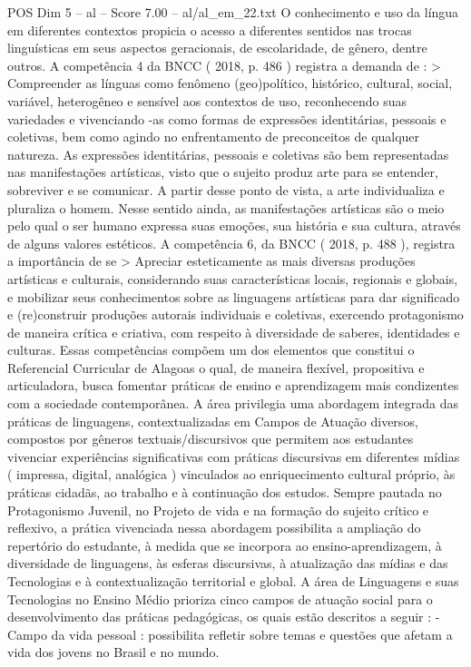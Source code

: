 \begin{textsample}{POS Dim 5 – al – Score 7.00 – al/al\_em\_22.txt}
O conhecimento e uso da língua em diferentes contextos propicia o acesso a diferentes sentidos nas trocas linguísticas em seus aspectos geracionais, de escolaridade, de gênero, dentre outros.
A competência 4 da BNCC ( 2018, p. 486 ) registra a demanda de : > Compreender as línguas como fenômeno (geo)político, histórico, cultural, social, variável, heterogêneo e sensível aos contextos de uso, reconhecendo suas variedades e vivenciando -as como formas de expressões identitárias, pessoais e coletivas, bem como agindo no enfrentamento de preconceitos de qualquer natureza.
As expressões identitárias, pessoais e coletivas são bem representadas nas manifestações artísticas, visto que o sujeito produz arte para se entender, sobreviver e se comunicar.
A partir desse ponto de vista, a arte individualiza e pluraliza o homem.
Nesse sentido ainda, as manifestações artísticas são o meio pelo qual o ser humano expressa suas emoções, sua história e sua cultura, através de alguns valores estéticos.
A competência 6, da BNCC ( 2018, p. 488 ), registra a importância de se > Apreciar esteticamente as mais diversas produções artísticas e culturais, considerando suas características locais, regionais e globais, e mobilizar seus conhecimentos sobre as linguagens artísticas para dar significado e (re)construir produções autorais individuais e coletivas, exercendo protagonismo de maneira crítica e criativa, com respeito à diversidade de saberes, identidades e culturas.
Essas competências compõem um dos elementos que constitui o Referencial Curricular de Alagoas o qual, de maneira flexível, propositiva e articuladora, busca fomentar práticas de ensino e aprendizagem mais condizentes com a sociedade contemporânea.
A área privilegia uma abordagem integrada das práticas de linguagens, contextualizadas em Campos de Atuação diversos, compostos por gêneros textuais/discursivos que permitem aos estudantes vivenciar experiências significativas com práticas discursivas em diferentes mídias ( impressa, digital, analógica ) vinculados ao enriquecimento cultural próprio, às práticas cidadãs, ao trabalho e à continuação dos estudos.
Sempre pautada no Protagonismo Juvenil, no Projeto de vida e na formação do sujeito crítico e reflexivo, a prática vivenciada nessa abordagem possibilita a ampliação do repertório do estudante, à medida que se incorpora ao ensino-aprendizagem, à diversidade de linguagens, às esferas discursivas, à atualização das mídias e das Tecnologias e à contextualização territorial e global.
A área de Linguagens e suas Tecnologias no Ensino Médio prioriza cinco campos de atuação social para o desenvolvimento das práticas pedagógicas, os quais estão descritos a seguir : - Campo da vida pessoal : possibilita refletir sobre temas e questões que afetam a vida dos jovens no Brasil e no mundo.

\end{textsample}
